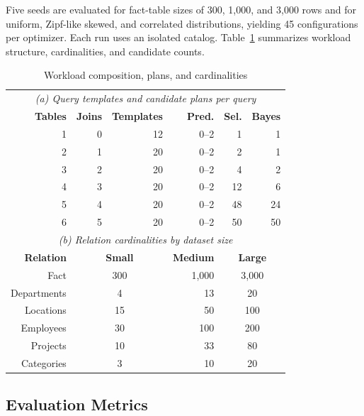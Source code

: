 \documentclass[conference]{IEEEtran}
\begin{document}
Five seeds are evaluated for fact-table sizes of 300, 1,000, and 3,000 rows and for uniform, Zipf-like skewed, and correlated distributions, yielding 45 configurations per optimizer. Each run uses an isolated catalog. Table~\ref{tab:workload} summarizes workload structure, cardinalities, and candidate counts.

\begin{table}[!t]
\caption{Workload composition, plans, and cardinalities}
\label{tab:workload}
\centering
\scriptsize
\begin{tabular}{rrrrrr}
\toprule
\multicolumn{6}{c}{\textit{(a) Query templates and candidate plans per query}}\\
\textbf{Tables} & \textbf{Joins} & \textbf{Templates} & \textbf{Pred.} & \textbf{Sel.} & \textbf{Bayes} \\
\midrule
1 & 0 & 12 & 0--2 & 1 & 1 \\
2 & 1 & 20 & 0--2 & 2 & 1 \\
3 & 2 & 20 & 0--2 & 4 & 2 \\
4 & 3 & 20 & 0--2 & 12 & 6 \\
5 & 4 & 20 & 0--2 & 48 & 24 \\
6 & 5 & 20 & 0--2 & 50 & 50 \\
\midrule
\multicolumn{6}{c}{\textit{(b) Relation cardinalities by dataset size}}\\
\textbf{Relation} & \multicolumn{2}{c}{\textbf{Small}} & \textbf{Medium} & \multicolumn{2}{c}{\textbf{Large}}\\
\midrule
Fact & \multicolumn{2}{c}{300} & 1,000 & \multicolumn{2}{c}{3,000}\\
Departments & \multicolumn{2}{c}{4} & 13 & \multicolumn{2}{c}{20}\\
Locations & \multicolumn{2}{c}{15} & 50 & \multicolumn{2}{c}{100}\\
Employees & \multicolumn{2}{c}{30} & 100 & \multicolumn{2}{c}{200}\\
Projects & \multicolumn{2}{c}{10} & 33 & \multicolumn{2}{c}{80}\\
Categories & \multicolumn{2}{c}{3} & 10 & \multicolumn{2}{c}{20}\\
\bottomrule
\end{tabular}
\end{table}

\subsection{Evaluation Metrics}
\end{document}
